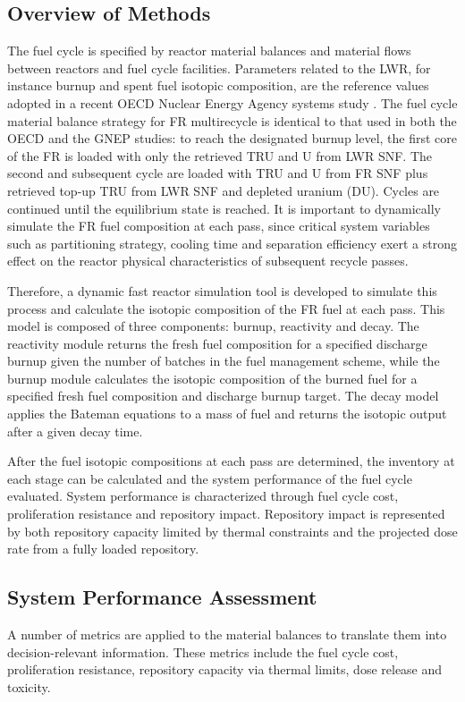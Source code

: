 \subsection{Overview of Methods}
\label{ses_sec:method_overview}
The fuel cycle is specified by reactor material balances and material
flows between reactors and fuel cycle facilities.  Parameters related to
the LWR, for instance burnup and spent fuel isotopic composition, are
the reference values adopted in a recent OECD Nuclear Energy Agency
systems study \cite{NEA-5990}.  The fuel cycle material balance strategy for FR
multirecycle is identical to that used in both the OECD and the GNEP
studies: to reach the designated burnup level, the first core of the FR
is loaded with only the retrieved TRU and U from LWR SNF. The second and
subsequent cycle are loaded with TRU and U from FR SNF plus retrieved
top-up TRU from LWR SNF and depleted uranium (DU).  Cycles are continued
until the equilibrium state is reached.  It is important to dynamically
simulate the FR fuel composition at each pass, since critical system
variables such as partitioning strategy, cooling time and separation
efficiency exert a strong effect on the reactor physical characteristics
of subsequent recycle passes. 

Therefore, a dynamic fast reactor simulation tool is developed to
simulate this process and calculate the isotopic composition of the FR
fuel at each pass.  This model is composed of three components: burnup,
reactivity and decay.  The reactivity module returns the fresh fuel
composition for a specified discharge burnup given the number of batches
in the fuel management scheme, while the burnup module calculates the
isotopic composition of the burned fuel for a specified fresh fuel
composition and discharge burnup target.  The decay model applies the
Bateman equations to a mass of fuel and returns the isotopic output
after a given decay time.  

After the fuel isotopic compositions at each pass are determined, the
inventory at each stage can be calculated and the system performance of
the fuel cycle evaluated.  System performance is characterized through
fuel cycle cost, proliferation resistance and repository impact. 
Repository impact is represented by both repository capacity limited by
thermal constraints and the projected dose rate from a fully loaded
repository.  



\subsection{System Performance Assessment}
\label{ses_sec:spa}
A number of metrics are applied to the material balances to translate
them into decision-relevant information.  These metrics include the fuel
cycle cost, proliferation resistance, repository capacity via thermal
limits, dose release and toxicity.


